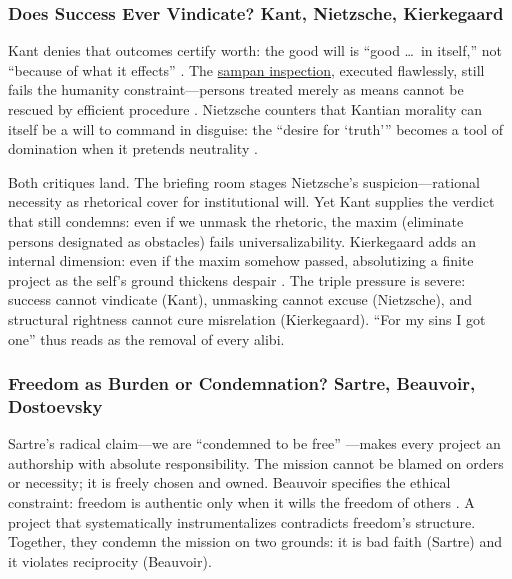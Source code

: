 \subsubsection*{Does Success Ever Vindicate? Kant, Nietzsche, Kierkegaard}

Kant denies that outcomes certify worth: the good will is ``good \ldots\ in itself,'' not
``because of what it effects'' \parencite[p.~27]{KantGroundwork1996}. The
\hyperref[scene:sampan]{sampan inspection}, executed flawlessly, still fails the humanity
constraint---persons treated merely as means cannot be rescued by efficient procedure
\parencite[pp.~36--37]{KantCPrR1996}. Nietzsche
counters that Kantian morality can itself be a will to command in disguise: the ``desire for
`truth''' becomes a tool of domination when it pretends neutrality
\parencite[\S 34]{NietzscheBGE1990}.

Both critiques land. The briefing room stages Nietzsche's suspicion---rational necessity as
rhetorical cover for institutional will. Yet Kant supplies the verdict that still condemns:
even if we unmask the rhetoric, the maxim (eliminate persons designated as obstacles) fails
universalizability. Kierkegaard adds an internal dimension: even if the maxim somehow passed,
absolutizing a finite project as the self's ground thickens despair
\parencite[pp.~69--83]{KierkegaardSUD1980}. The triple pressure is severe: success cannot
vindicate (Kant), unmasking cannot excuse (Nietzsche), and structural rightness cannot cure
misrelation (Kierkegaard). ``For my sins I got one'' thus reads as the removal of every alibi.

\subsubsection*{Freedom as Burden or Condemnation? Sartre, Beauvoir, Dostoevsky}

Sartre's radical claim---we are ``condemned to be free''
\parencite[pp.~34--36]{SartreBN2003}---makes every project an authorship with absolute
responsibility. The mission cannot be blamed on
orders or necessity; it is freely chosen and owned. Beauvoir specifies the ethical constraint:
freedom is authentic only when it wills the freedom of others \parencite[p.~73]{Beauvoir1976}.
A project that systematically instrumentalizes contradicts freedom's structure. Together, they
condemn the mission on two grounds: it is bad faith (Sartre) and it violates reciprocity
(Beauvoir).

